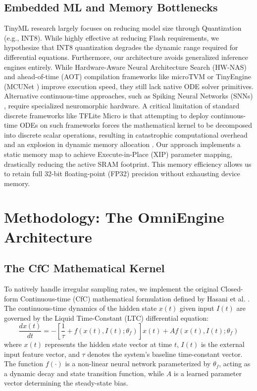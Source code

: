 \documentclass[conference]{IEEEtran}
\begin{document}
\subsection{Embedded ML and Memory Bottlenecks}
TinyML research \cite{warden2020tinyml} largely focuses on reducing model size through Quantization (e.g., INT8). While highly effective at reducing Flash requirements, we hypothesize that INT8 quantization degrades the dynamic range required for differential equations. Furthermore, our architecture avoids generalized inference engines entirely. While Hardware-Aware Neural Architecture Search (HW-NAS) \cite{cai2018proxylessnas} and ahead-of-time (AOT) compilation frameworks like microTVM or TinyEngine (MCUNet \cite{lin2020mcunet}) improve execution speed, they still lack native ODE solver primitives. Alternative continuous-time approaches, such as Spiking Neural Networks (SNNs) \cite{roy2019towards}, require specialized neuromorphic hardware. A critical limitation of standard discrete frameworks like TFLite Micro \cite{david2021tflitemicro} is that attempting to deploy continuous-time ODEs on such frameworks forces the mathematical kernel to be decomposed into discrete scalar operations, resulting in catastrophic computational overhead and an explosion in dynamic memory allocation \cite{banbury2021mlperf}. Our approach implements a static memory map to achieve Execute-in-Place (XIP) parameter mapping, drastically reducing the active SRAM footprint. This memory efficiency allows us to retain full 32-bit floating-point (FP32) precision without exhausting device memory.

\section{Methodology: The OmniEngine Architecture}

\subsection{The CfC Mathematical Kernel}
To natively handle irregular sampling rates, we implement the original Closed-form Continuous-time (CfC) mathematical formulation defined by Hasani et al. \cite{hasani2022closed}. The continuous-time dynamics of the hidden state $x(t)$ given input $I(t)$ are governed by the Liquid Time-Constant (LTC) differential equation:
\begin{equation}
\frac{dx(t)}{dt} = -\left[\frac{1}{\tau} + f(x(t), I(t); \theta_f)\right] x(t) + A f(x(t), I(t); \theta_f)
\label{eq:ltc_ode}
\end{equation}
where $x(t)$ represents the hidden state vector at time $t$, $I(t)$ is the external input feature vector, and $\tau$ denotes the system's baseline time-constant vector. The function $f(\cdot)$ is a non-linear neural network parameterized by $\theta_f$, acting as a dynamic decay and state transition function, while $A$ is a learned parameter vector determining the steady-state bias.
\end{document}

